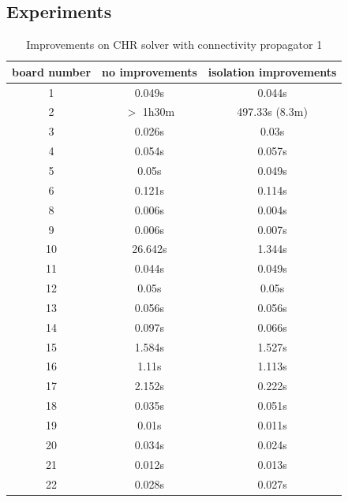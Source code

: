 \documentclass{report}
\begin{document}
\subsection{Experiments}
\begin{table}[h]
\centering
\begin{tabular}{|c|c|c|}
\hline
 board number & no improvements & isolation improvements\\
 \hline
      1   & 0.049s & 0.044s \\
      2   & $>$ 1h30m & 497.33s (8.3m)\\
      3   & 0.026s & 0.03s\\
      4   & 0.054s & 0.057s\\
      5   & 0.05s & 0.049s\\
      6   & 0.121s & 0.114s\\
      8   & 0.006s & 0.004s\\
      9   & 0.006s & 0.007s\\
      10  & 26.642s & 1.344s\\
      11  & 0.044s & 0.049s\\
      12  & 0.05s & 0.05s\\
      13  & 0.056s & 0.056s\\
      14  & 0.097s & 0.066s\\
      15  & 1.584s & 1.527s\\
      16  & 1.11s & 1.113s\\
      17  & 2.152s & 0.222s\\
      18  & 0.035s & 0.051s\\
      19  & 0.01s & 0.011s\\
      20  & 0.034s & 0.024s\\
      21  & 0.012s & 0.013s\\
      22  & 0.028s & 0.027s\\
\hline
\end{tabular}
\caption{Improvements on CHR solver with connectivity propagator 1}
\end{table}
\end{document}
